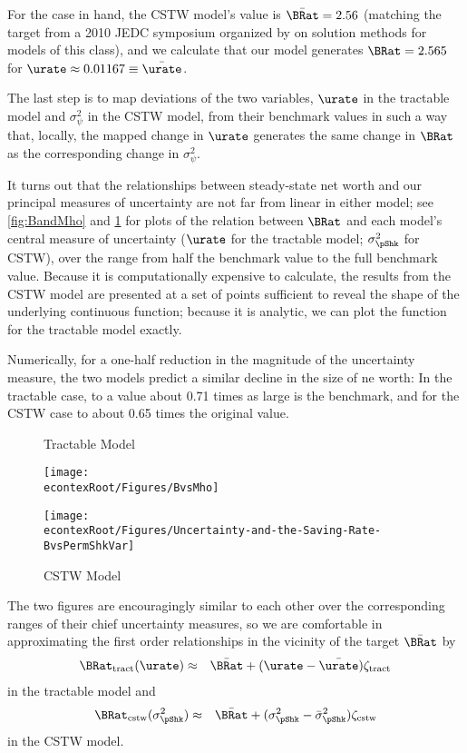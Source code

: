 \documentclass[../../cjSOE.tex]{subfiles}
\begin{document}
For the case in hand, the CSTW model's value is $\bar{\BRat} = 2.56$ (matching the target from a 2010 JEDC symposium organized by \cite{djjKS} on solution methods for models of this class), and we calculate that our model generates $\BRat=2.565$ for $\urate \approx 0.01167\equiv\bar{\urate}$. 

The last step is to map deviations of the two variables, $\urate$ in the tractable model and $\sigma^{2}_{\psi}$ in the CSTW model, from their benchmark values in such a way that, locally, the mapped change in $\urate$ generates the same change in $\BRat$ as the corresponding change in $\sigma^{2}_{\psi}$.

It turns out that the relationships between steady-state net worth and our principal measures of uncertainty are not far from linear in either model; see \ref{fig:BandMho} and \ref{fig:BandPShockVar} for plots of the relation between $\BRat$ and each model's central measure of uncertainty ($\urate$ for the tractable model; $\sigma^{2}_{\pShk}$ for CSTW), over the range from half the benchmark value to the full benchmark value.  Because it is computationally expensive to calculate, the results from the CSTW model are presented at a set of points sufficient to reveal the shape of the underlying continuous function; because it is analytic, we can plot the function for the tractable model exactly.

Numerically, for a one-half reduction in the magnitude of the uncertainty measure, the two models predict a similar decline in the size of ne worth: In the tractable case, to a value about 0.71 times as large is the benchmark, and for the CSTW case to about 0.65 times the original value.

\begin{figure}
  \caption{Tractable Model}\label{fig:BandMho}
  \texttt{[image: \\econtexRoot/Figures/BvsMho]}
  \caption{CSTW Model}\label{fig:BandPShockVar}
  \texttt{[image: \\econtexRoot/Figures/Uncertainty-and-the-Saving-Rate-BvsPermShkVar]}
\end{figure}

The two figures are encouragingly similar to each other over the corresponding ranges of their chief uncertainty measures, so we are comfortable in approximating the first order relationships in the vicinity of the target $\bar{\BRat}$ by 
\begin{eqnarray}
  \BRat_\text{tract}(\urate) & \approx & \bar{\BRat} + (\urate-\bar{\urate})\zeta_{\text{tract}} 
\end{eqnarray}
in the tractable model and 
\begin{eqnarray}
  \BRat_{\text{cstw}}(\sigma^{2}_{\pShk}) & \approx & \bar{\BRat} + (\sigma^{2}_{\pShk}-\bar{\sigma}^{2}_{\pShk})\zeta_{\text{cstw}} 
\end{eqnarray}
in the CSTW model.
\end{document}
